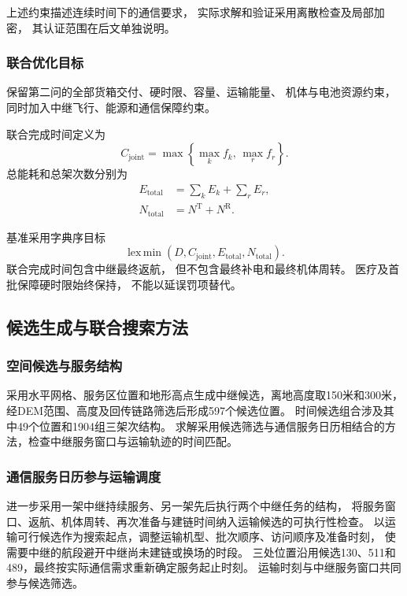 \documentclass[bwprint]{gmcmthesis}
\begin{document}
上述约束描述连续时间下的通信要求，
实际求解和验证采用离散检查及局部加密，
其认证范围在后文单独说明。

\subsubsection{联合优化目标}

保留第二问的全部货箱交付、硬时限、容量、运输能量、
机体与电池资源约束，
同时加入中继飞行、能源和通信保障约束。

联合完成时间定义为
\begin{equation}
    C_{\mathrm{joint}}
    =
    \max\left\{
    \max_k f_k,\,
    \max_r f_r
    \right\}.
\end{equation}
总能耗和总架次数分别为
\begin{align}
    E_{\mathrm{total}}
    &=
    \sum_k E_k+\sum_r E_r,\\
    N_{\mathrm{total}}
    &=
    N^{\mathrm{T}}+N^{\mathrm{R}}.
\end{align}

基准采用字典序目标
\begin{equation}
    \operatorname{lex\,min}
    \left(
    D,C_{\mathrm{joint}},
    E_{\mathrm{total}},N_{\mathrm{total}}
    \right).
\end{equation}
联合完成时间包含中继最终返航，
但不包含最终补电和最终机体周转。
医疗及首批保障硬时限始终保持，
不能以延误罚项替代。

\subsection{候选生成与联合搜索方法}
\subsubsection{空间候选与服务结构}
采用水平网格、服务区位置和地形高点生成中继候选，离地高度取150米和300米，
经DEM范围、高度及回传链路筛选后形成597个候选位置。
时间候选组合涉及其中49个位置和1904组三架次结构。
求解采用候选筛选与通信服务日历相结合的方法，检查中继服务窗口与运输轨迹的时间匹配。

\subsubsection{通信服务日历参与运输调度}
进一步采用一架中继持续服务、另一架先后执行两个中继任务的结构，
将服务窗口、返航、机体周转、再次准备与建链时间纳入运输候选的可执行性检查。
以运输可行候选作为搜索起点，调整运输机型、批次顺序、访问顺序及准备时刻，
使需要中继的航段避开中继尚未建链或换场的时段。
三处位置沿用候选130、511和489，最终按实际通信需求重新确定服务起止时刻。
运输时刻与中继服务窗口共同参与候选筛选。
\end{document}
